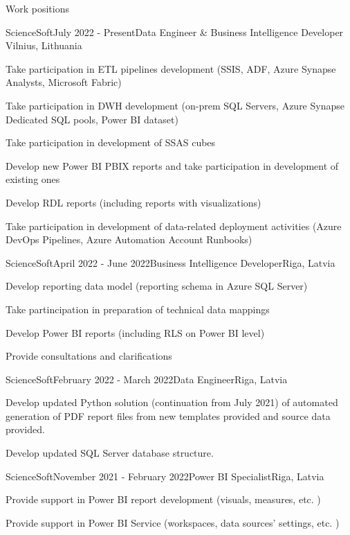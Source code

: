 \documentclass{resume} %
\begin{document}
\begin{rSection}{Work positions}

\begin{rSubsection}{ScienceSoft}{July 2022 - Present}{Data Engineer \& Business Intelligence Developer
}{Vilnius, Lithuania}
\item Take participation in ETL pipelines development (SSIS, ADF, Azure Synapse Analysts, Microsoft Fabric)
\item Take participation in DWH development (on-prem SQL Servers, Azure Synapse Dedicated SQL pools, Power BI dataset)
\item Take participation in development of SSAS cubes
\item Develop new Power BI PBIX reports and take participation in development of existing ones
\item Develop RDL reports (including reports with visualizations)
\item Take participation in development of data-related deployment activities (Azure DevOps Pipelines, Azure Automation Account Runbooks)
\end{rSubsection}

\begin{rSubsection}{ScienceSoft}{April 2022 - June 2022}{Business Intelligence Developer}{Riga, Latvia}
\item Develop reporting data model (reporting schema in Azure SQL Server)
\item Take partincipation in preparation of technical data mappings
\item Develop Power BI reports (including RLS on Power BI level)
\item Provide consultations and clarifications
\end{rSubsection}

\begin{rSubsection}{ScienceSoft}{February 2022 - March 2022}{Data Engineer}{Riga, Latvia}
\item Develop updated Python solution (continuation from July 2021) of automated generation of PDF report files from new templates provided and source data provided.
\item Develop updated SQL Server database structure.
\end{rSubsection}

\begin{rSubsection}{ScienceSoft}{November 2021 - February 2022}{Power BI Specialist}{Riga, Latvia}
\item Provide support in Power BI report development (visuals, measures, etc. )
\item Provide support in Power BI Service (workspaces, data sources' settings, etc. )
\end{rSubsection}


\end{rSection}
\end{document}
